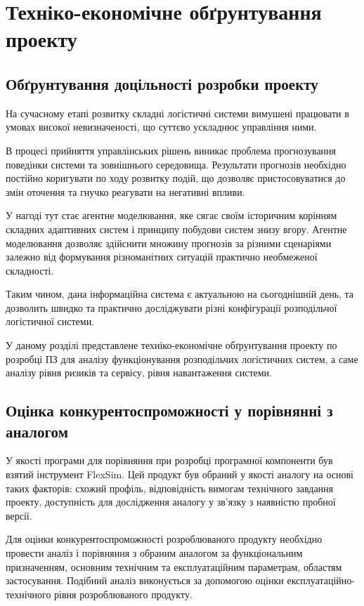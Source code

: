 \section{Техніко-економічне обґрунтування проекту}
\subsection{Обґрунтування доцільності розробки проекту}
На сучасному етапі розвитку складні логістичні системи вимушені працювати в умовах високої невизначеності, що суттєво ускладнює управління ними. 

В процесі прийняття управлінських рішень виникає проблема прогнозування поведінки системи та зовнішнього середовища. 
Результати прогнозів необхідно постійно коригувати по ходу розвитку подій, що дозволяє пристосовуватися до змін оточення та гнучко реагувати на негативні впливи. 

У нагоді тут стає агентне моделювання, яке сягає своїм історичним корінням складних адаптивних систем і принципу побудови систем знизу вгору.
Агентне моделювання дозволяє здійснити множину прогнозів за різними сценаріями залежно від формування різноманітних ситуацій практично необмеженої складності. 

Таким чином, дана інформаційна система є актуальною на сьогоднішній день, та дозволить швидко та практично досліджувати різні конфігурації розподільчої логістичної системи.

У даному розділі представлене техніко-економічне обґрунтування проекту по розробці ПЗ для аналізу функціонування розподільчих логістичних систем, а саме аналізу рівня ризиків та сервісу, рівня навантаження системи.

\subsection{Оцінка конкурентоспроможності у порівнянні з аналогом}
У якості програми для порівняння при розробці програмної компоненти був взятий інструмент FlexSim.
Цей продукт був обраний у якості аналогу на основі таких факторів: схожий профіль, відповідність вимогам технічного завдання проекту, доступність для дослідження аналогу у зв'язку з наявністю пробної версії.

Для оцінки конкурентоспроможності розроблюваного продукту необхідно провести аналіз і порівняння з обраним аналогом за функціональним призначенням, основним технічним та експлуатаційним параметрам, областям застосування. 
Подібний аналіз виконується за допомогою оцінки експлуатаційно-технічного рівня розроблюваного продукту.

